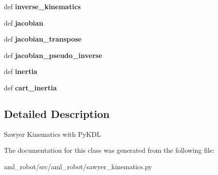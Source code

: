 \begin{DoxyCompactItemize}
\item 
\hypertarget{classaml__robot_1_1sawyer__kinematics_1_1sawyer__kinematics_a1149e0105daa41790414e42085a09014}{def {\bfseries inverse\-\_\-kinematics}}\label{classaml__robot_1_1sawyer__kinematics_1_1sawyer__kinematics_a1149e0105daa41790414e42085a09014}

\item 
\hypertarget{classaml__robot_1_1sawyer__kinematics_1_1sawyer__kinematics_afc306cef082b9af015271a07c06309bf}{def {\bfseries jacobian}}\label{classaml__robot_1_1sawyer__kinematics_1_1sawyer__kinematics_afc306cef082b9af015271a07c06309bf}

\item 
\hypertarget{classaml__robot_1_1sawyer__kinematics_1_1sawyer__kinematics_a14cc87ea36aa2190e99dd5e3aec644f9}{def {\bfseries jacobian\-\_\-transpose}}\label{classaml__robot_1_1sawyer__kinematics_1_1sawyer__kinematics_a14cc87ea36aa2190e99dd5e3aec644f9}

\item 
\hypertarget{classaml__robot_1_1sawyer__kinematics_1_1sawyer__kinematics_a370ad1a3a854db55fe76afa5067caf67}{def {\bfseries jacobian\-\_\-pseudo\-\_\-inverse}}\label{classaml__robot_1_1sawyer__kinematics_1_1sawyer__kinematics_a370ad1a3a854db55fe76afa5067caf67}

\item 
\hypertarget{classaml__robot_1_1sawyer__kinematics_1_1sawyer__kinematics_a850a6abcc74bd95c703f7296dcfd38f6}{def {\bfseries inertia}}\label{classaml__robot_1_1sawyer__kinematics_1_1sawyer__kinematics_a850a6abcc74bd95c703f7296dcfd38f6}

\item 
\hypertarget{classaml__robot_1_1sawyer__kinematics_1_1sawyer__kinematics_a772d9ff47fd14df6cb9552adbc89cfe8}{def {\bfseries cart\-\_\-inertia}}\label{classaml__robot_1_1sawyer__kinematics_1_1sawyer__kinematics_a772d9ff47fd14df6cb9552adbc89cfe8}

\end{DoxyCompactItemize}


\subsection{Detailed Description}
\begin{DoxyVerb}Sawyer Kinematics with PyKDL
\end{DoxyVerb}
 

The documentation for this class was generated from the following file\-:\begin{DoxyCompactItemize}
\item 
aml\-\_\-robot/src/aml\-\_\-robot/sawyer\-\_\-kinematics.\-py\end{DoxyCompactItemize}
